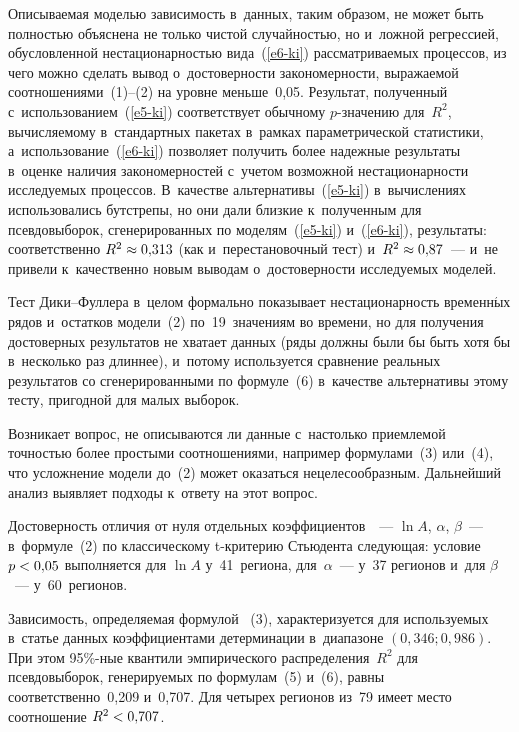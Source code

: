 \begin{multicols}{2}
 Описываемая моделью зависимость в~данных, таким образом, не может быть 
полностью объяснена не только чистой случайностью, но и~ложной регрессией, 
обусловленной не\-ста\-ци\-о\-нар\-ностью вида~(\ref{e6-ki}) рас\-смат\-ри\-ва\-емых процессов, из 
чего можно сделать вывод о~до\-сто\-вер\-ности за\-ко\-но\-мер\-ности, вы\-ра\-жа\-емой 
соотношениями~(1)--(2) на уровне меньше~0,05. Результат, полученный 
с~использованием~(\ref{e5-ki}) соответствует обыч\-но\-му $p$-зна\-че\-нию для~$R^2$, 
вы\-чис\-ля\-емо\-му в~стандартных пакетах в~рамках параметрической статистики, 
а~использование~(\ref{e6-ki}) позволяет получить более надежные результаты в~оценке 
наличия закономерностей с~учетом возможной нестационарности исследуемых 
процессов. В~качестве альтернативы~(\ref{e5-ki}) в~вы\-чис\-ле\-ни\-ях использовались бутстрепы, но 
они дали близкие к~полученным для псевдовыборок, сгенерированных по моделям~(\ref{e5-ki}) 
и~(\ref{e6-ki}), результаты: соответственно $R^2\hm\approx 0{,}313$ (как и~перестановочный 
тест) и~$R^2\hm\approx 0{,}87$~--- и~не привели к~качественно новым выводам 
о~до\-сто\-вер\-ности ис\-сле\-ду\-емых моделей.
{

}
  
  Тест Дики--Фуллера в~целом формально показывает нестационарность временн$\acute{\mbox{ы}}$х 
рядов и~остатков модели~(2) по~19~значениям во времени, но для получения 
достоверных результатов не хватает данных (ряды должны были бы быть хотя бы 
в~несколько раз длиннее), и~потому используется сравнение реальных результатов со 
сгенерированными по формуле~(6) в~качестве альтернативы этому тесту, пригодной для 
малых выборок. 
  
  Возникает вопрос, не описываются ли данные с~настолько приемлемой точ\-ностью 
более прос\-ты\-ми соотношениями, например формулами~(3) или~(4), что усложнение 
модели до~(2) может оказаться нецелесообразным. Дальнейший анализ выявляет 
подходы к~ответу на этот вопрос.
   
  Достоверность отличия от нуля отдельных коэффициентов~~--- $\ln A$, $\alpha$, 
$\beta$~--- в~формуле~(2) по классическому t-кри\-те\-рию Стьюдента следующая: 
условие $p\hm < 0{,}05$ выполняется для $\ln A$ у~41~региона, для~$\alpha$~--- у~37 
регионов и~для $\beta$~--- у~60~регионов.
{

}
  
  Зависимость, определяемая формулой~ (3), характеризуется для используемых 
в~статье данных коэффициентами детерминации в~диапазоне $(0{,}346; 0{,}986)$. При 
этом 95\%-ные квантили эмпирического распределения~$R^2$ для псевдовыборок, 
генерируемых по формулам~(5) и~(6), равны соответственно~0,209 и~0,707. Для четырех 
регионов из~79 имеет место соотношение $R^2\hm< 0{,}707$.
{

}
\end{multicols}
